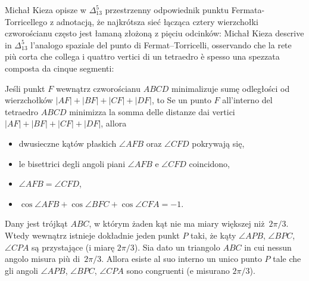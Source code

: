 Michał Kieza opisze w $\Delta_{13}^5$ przestrzenny odpowiednik punktu Fermata-Torricellego z adnotacją, że najkrótsza sieć łącząca cztery wierzchołki czworościanu często jest łamaną złożoną z pięciu odcinków: %
Michał Kieza descrive in $\Delta_{13}^5$ l'analogo spaziale del punto di Fermat--Torricelli, osservando che la rete più corta che collega i quattro vertici di un tetraedro è spesso una spezzata composta da cinque segmenti: %

\begin{proposition}
    Jeśli punkt $F$ wewnątrz czworościanu $ABCD$ minimalizuje sumę odległości od wierzchołków $|AF| + |BF| + |CF| + |DF|$, to %
    Se un punto $F$ all'interno del tetraedro $ABCD$ minimizza la somma delle distanze dai vertici $|AF| + |BF| + |CF| + |DF|$, allora %
    \begin{itemize}
    \item dwusieczne kątów płaskich $\angle AFB$ oraz $\angle CFD$ pokrywają się, %
    \item le bisettrici degli angoli piani $\angle AFB$ e $\angle CFD$ coincidono, %
    \item $\angle AFB = \angle CFD$,
    \item $\cos \angle AFB + \cos \angle BFC + \cos \angle CFA = -1$.
    \end{itemize}
\end{proposition}


\begin{proposition}
    Dany jest trójkąt $ABC$, w którym żaden kąt nie ma miary większej niż~$2\pi/3$. %
    Wtedy wewnątrz istnieje dokładnie jeden punkt $P$ taki, że kąty $\angle APB$, $\angle BPC$, $\angle CPA$ są przystające (i miarę $2\pi/3$). %
    Sia dato un triangolo $ABC$ in cui nessun angolo misura più di~$2\pi/3$. %
    Allora esiste al suo interno un unico punto $P$ tale che gli angoli $\angle APB$, $\angle BPC$, $\angle CPA$ sono congruenti (e misurano $2\pi/3$). %
\end{proposition}


